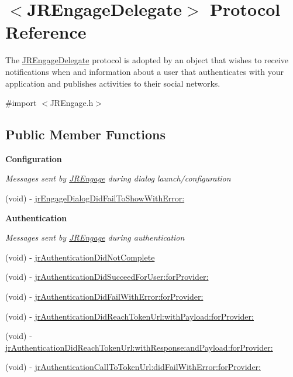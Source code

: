 \hypertarget{protocol_j_r_engage_delegate-p}{
\section{$<$JREngageDelegate$>$ Protocol Reference}
\label{protocol_j_r_engage_delegate-p}
}


The \hyperlink{protocol_j_r_engage_delegate-p}{JREngageDelegate} protocol is adopted by an object that wishes to receive notifications when and information about a user that authenticates with your application and publishes activities to their social networks.  




{\ttfamily \#import $<$JREngage.h$>$}

\subsection*{Public Member Functions}
\begin{Indent}{\bf Configuration}\par
{\em \label{_amgrp254f642527b45bc260048e30704edb39}
 Messages sent by \hyperlink{class_j_r_engage}{JREngage} during dialog launch/configuration }\begin{DoxyCompactItemize}
\item 
(void) -\/ \hyperlink{protocol_j_r_engage_delegate-p_af46f7ef0c7a5767dc0ab705871d570ac}{jrEngageDialogDidFailToShowWithError:}
\end{DoxyCompactItemize}
\end{Indent}
\begin{Indent}{\bf Authentication}\par
{\em \label{_amgrpc75f7811d70d17dbcd88e9d03752cbed}
 Messages sent by \hyperlink{class_j_r_engage}{JREngage} during authentication }\begin{DoxyCompactItemize}
\item 
(void) -\/ \hyperlink{protocol_j_r_engage_delegate-p_a4eaa6a5961e175b8275c6b06034afea7}{jrAuthenticationDidNotComplete}
\item 
(void) -\/ \hyperlink{protocol_j_r_engage_delegate-p_a6ac183348ebc0e858e8aad0682b5e1cd}{jrAuthenticationDidSucceedForUser:forProvider:}
\item 
(void) -\/ \hyperlink{protocol_j_r_engage_delegate-p_ac16b7db45fd324d597260dc8579b3a22}{jrAuthenticationDidFailWithError:forProvider:}
\item 
(void) -\/ \hyperlink{protocol_j_r_engage_delegate-p_abfafec7eed95008f7b7052d962f8f6fa}{jrAuthenticationDidReachTokenUrl:withPayload:forProvider:}
\item 
(void) -\/ \hyperlink{protocol_j_r_engage_delegate-p_a2cbed662f784706d2db038e1cb9ba3fd}{jrAuthenticationDidReachTokenUrl:withResponse:andPayload:forProvider:}
\item 
(void) -\/ \hyperlink{protocol_j_r_engage_delegate-p_a670eab0f76e79ba90a246a2f3e4dfe04}{jrAuthenticationCallToTokenUrl:didFailWithError:forProvider:}
\end{DoxyCompactItemize}
\end{Indent}

